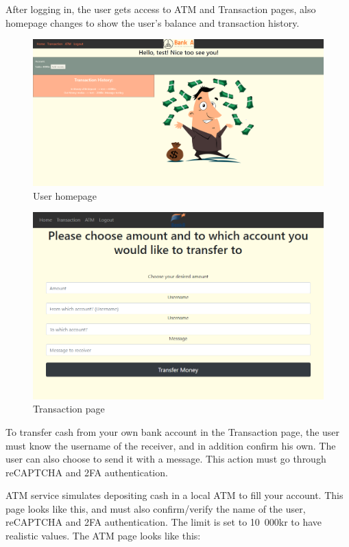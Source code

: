 After logging in, the user gets access to ATM and Transaction pages, also homepage changes to show the user’s balance and transaction history.

\begin{figure}[H]
    \centering
    \includegraphics[width=\textwidth]{pics/pic3homeuser.PNG}
    \caption{User homepage}
    \label{fig:cha1fig3userhomepage}
\end{figure}

\begin{figure}[H]
    \centering
    \includegraphics[width=\textwidth]{pics/pic 3.1.PNG}
    \caption{Transaction page}
    \label{fig:cha1fig3.1transactionpage}
\end{figure}

To transfer cash from your own bank account in the Transaction page, the user must know the username of the receiver, and in addition confirm his own. The user can also choose to send it with a message. This action must go through reCAPTCHA and 2FA authentication. 

ATM service simulates depositing cash in a local ATM to fill your account. This page looks like this, and must also confirm/verify the name of the user, reCAPTCHA and 2FA authentication. The limit is set to 10 000kr to have realistic values. The ATM page looks like this:

